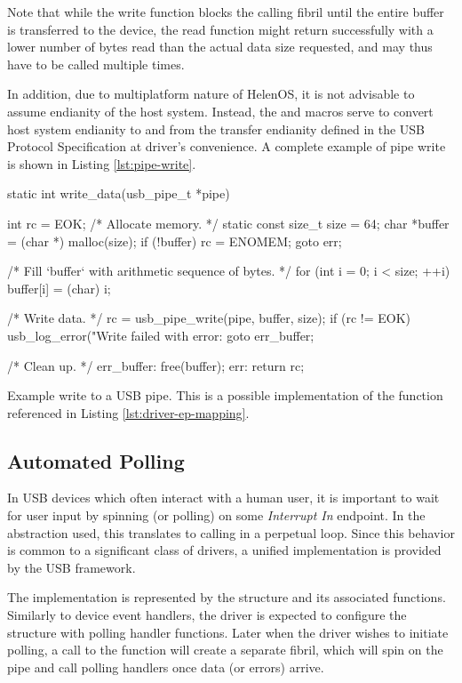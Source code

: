 Note that while the write function blocks the calling fibril until the entire
buffer is transferred to the device, the read function might return successfully
with a lower number of bytes read than the actual data size requested, and may
thus have to be called multiple times.

In addition, due to multiplatform nature of HelenOS, it is not advisable to
assume endianity of the host system. Instead, the 
and  macros serve to convert host system endianity
to and from the transfer endianity defined in the USB Protocol Specification at
driver's convenience. A complete example of pipe write is shown in Listing
\ref{lst:pipe-write}.

\begin{listing}
	\begin{code}
		static int write_data(usb_pipe_t *pipe)
		{
			int rc = EOK;
			/* Allocate memory. */
			static const size_t size = 64;
			char *buffer = (char *) malloc(size);
			if (!buffer) {
				rc = ENOMEM;
				goto err;
			}

			/* Fill `buffer` with arithmetic sequence of bytes. */
			for (int i = 0; i < size; ++i) buffer[i] = (char) i;

			/* Write data. */
			rc = usb_pipe_write(pipe, buffer, size);
			if (rc != EOK) {
				usb_log_error("Write failed with error: %
				goto err_buffer;
			}

			/* Clean up. */
		err_buffer:
			free(buffer);
		err:
			return rc;
		}
	\end{code}
	\caption[Example write to a USB pipe.]{Example write to a USB pipe. This is
	a possible implementation of the  function referenced in
	Listing \ref{lst:driver-ep-mapping}.}
	\label{lst:pipe-write}
\end{listing}


\subsection{Automated Polling}

In USB devices which often interact with a human user, it is important to wait
for user input by spinning (or polling) on some \textit{Interrupt In} endpoint.
In the abstraction used, this translates to calling  in a
perpetual loop. Since this behavior is common to a significant class of drivers,
a unified implementation is provided by the USB framework.

The implementation is represented by the  structure and
its associated functions. Similarly to device event handlers, the driver is
expected to configure the structure with polling handler functions. Later when
the driver wishes to initiate polling, a call to the 
function will create a separate fibril, which will spin on the pipe and call
polling handlers once data (or errors) arrive.

